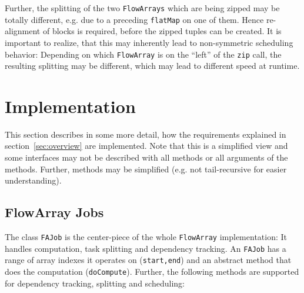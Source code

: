 \documentclass[runningheads,a4paper,fleqn]{llncs}
\begin{document}
Further, the splitting of the two \texttt{FlowArrays} which are being zipped
may be totally different, e.g. due to a preceding \texttt{flatMap} on
one of them. Hence re-alignment of blocks is required,
before the zipped tuples can be created. It is important to realize,
that this may inherently lead to non-symmetric scheduling behavior:
Depending on which \texttt{FlowArray} is on the ``left'' of the \texttt{zip}
call, the resulting splitting may be different, which may lead to
different speed at runtime. 

\section{Implementation}
\label{sec:implementation}

This section describes in some more detail, how the requirements
explained in section~\ref{sec:overview} are implemented. Note that
this is a simplified view and some interfaces may not be described
with all methods or all arguments of the methods. Further, methods may
be simplified (e.g. not tail-recursive for easier understanding).

\subsection{FlowArray Jobs}
The class \texttt{FAJob} is the center-piece of the whole \texttt{FlowArray}
implementation: It handles computation, task splitting and dependency
tracking. An \texttt{FAJob} has a range of array indexes it operates
on
(\texttt{start,end}) and an abstract method that does the computation
(\texttt{doCompute}). Further, the following methods are supported for
dependency tracking, splitting and scheduling:
\end{document}
